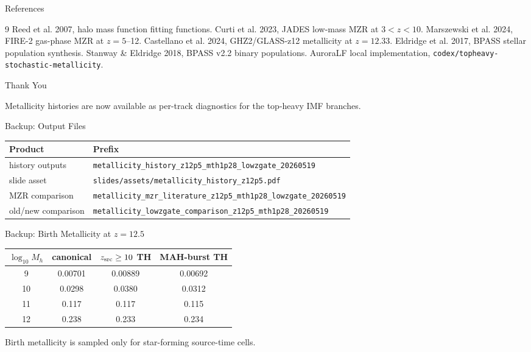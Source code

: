 \documentclass[aspectratio=169,10pt]{beamer}
\begin{document}
\begin{frame}{References}
\small
\begin{thebibliography}{9}
 Reed et al. 2007, halo mass function fitting functions.
 Curti et al. 2023, JADES low-mass MZR at $3<z<10$.
 Marszewski et al. 2024, FIRE-2 gas-phase MZR at $z=5$--12.
 Castellano et al. 2024, GHZ2/GLASS-z12 metallicity at $z=12.33$.
 Eldridge et al. 2017, BPASS stellar population synthesis.
 Stanway \& Eldridge 2018, BPASS v2.2 binary populations.
 AuroraLF local implementation,
\texttt{codex/topheavy-stochastic-metallicity}.
\end{thebibliography}
\end{frame}

\begin{frame}{Thank You}
\begin{center}
\Large
Metallicity histories are now available as per-track diagnostics for the
top-heavy IMF branches.
\end{center}
\end{frame}

\appendix

\begin{frame}{Backup: Output Files}
\small
\begin{tabular}{ll}
\toprule
Product & Prefix\\
\midrule
history outputs & \texttt{metallicity\_history\_z12p5\_mth1p28\_lowzgate\_20260519}\\
slide asset & \texttt{slides/assets/metallicity\_history\_z12p5.pdf}\\
MZR comparison & \texttt{metallicity\_mzr\_literature\_z12p5\_mth1p28\_lowzgate\_20260519}\\
old/new comparison & \texttt{metallicity\_lowzgate\_comparison\_z12p5\_mth1p28\_20260519}\\
\bottomrule
\end{tabular}
\end{frame}

\begin{frame}{Backup: Birth Metallicity at \texorpdfstring{$z=12.5$}{z=12.5}}
\begin{center}
\small
\begin{tabular}{cccc}
\toprule
$\log_{10}M_h$ &
canonical &
$z_{\rm src}\ge10$ TH &
MAH-burst TH\\
\midrule
9  & 0.00701 & 0.00889 & 0.00692\\
10 & 0.0298  & 0.0380  & 0.0312\\
11 & 0.117   & 0.117   & 0.115\\
12 & 0.238   & 0.233   & 0.234\\
\bottomrule
\end{tabular}
\end{center}
\vspace{2mm}
\small Birth metallicity is sampled only for star-forming source-time cells.
\end{frame}
\end{document}

